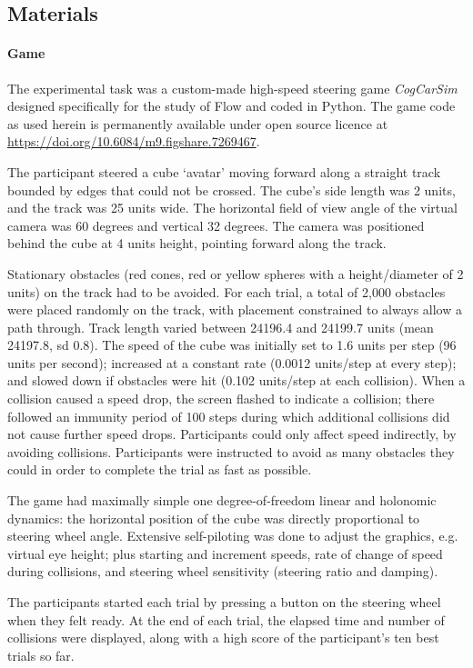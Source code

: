 \documentclass{frontierstyle/frontiersSCNS}
\begin{document}
\subsection{Materials}
\paragraph*{Game} The experimental task was a custom-made high-speed steering game {\it CogCarSim} designed specifically for the study of Flow and coded in Python. The game code as used herein is permanently available under open source licence at \url{https://doi.org/10.6084/m9.figshare.7269467}.

The participant steered a cube `avatar' moving forward along a straight track bounded by edges that could not be crossed. The cube's side length was 2 units, and the track was 25 units wide.  The horizontal field of view angle of the virtual camera was 60 degrees and vertical 32 degrees. The camera was positioned behind the cube at 4 units height, pointing forward along the track.

Stationary obstacles (red cones, red or yellow spheres with a height/diameter of 2 units) on the track had to be avoided. For each trial, a total of 2,000 obstacles were placed randomly on the track, with placement constrained to always allow a path through. Track length varied between 24196.4 and 24199.7 units (mean 24197.8, sd 0.8). The speed of the cube was initially set to 1.6 units per step (96 units per second); increased at a constant rate (0.0012 units/step at every step); and slowed down if obstacles were hit (0.102 units/step at each collision). When a collision caused a speed drop, the screen flashed to indicate a collision; there followed an immunity period of 100 steps during which additional collisions did not cause further speed drops. Participants could only affect speed indirectly, by avoiding collisions.  Participants were instructed to avoid as many obstacles they could in order to complete the trial as fast as possible.

The game had maximally simple one degree-of-freedom linear and holonomic dynamics: the horizontal position of the cube was directly proportional to steering wheel angle. Extensive self-piloting was done to adjust the graphics, e.g. virtual eye height; plus starting and increment speeds, rate of change of speed during collisions, and steering wheel sensitivity (steering ratio and damping).

The participants started each trial by pressing a button on the steering wheel when they felt ready. At the end of each trial, the elapsed time and number of collisions were displayed, along with a high score of the participant's ten best trials so far.
\end{document}
